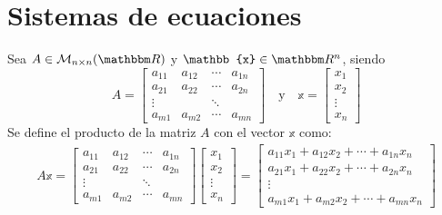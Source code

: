 \section{Sistemas de ecuaciones}

\begin{definition}\label{definicion:JSJJNDJUDUDJNDN}
    Sea $A \in \mathcal{M}_{n \times n}(\RR)$ y $\mathbb{x} \in \RR[n]$, siendo
    $$A = \begin{bmatrix}
        a_{11} & a_{12} & \cdots & a_{1n}\\
        a_{21} & a_{22} & \cdots & a_{2n}\\
        \vdots &  & \ddots & \\
        a_{m1} & a_{m2} & \cdots & a_{mn}
    \end{bmatrix} \quad \text{y} \quad \mathbb{x} = \begin{bmatrix}
        x_1 \\
        x_2 \\
        \vdots \\
        x_n
    \end{bmatrix}$$
    Se define el producto de la matriz $A$ con el vector $\mathbb{x}$ como:
    \begin{align*}
        A \mathbb{x} = \begin{bmatrix}
            a_{11} & a_{12} & \cdots & a_{1n}\\
            a_{21} & a_{22} & \cdots & a_{2n}\\
            \vdots &  & \ddots & \\
            a_{m1} & a_{m2} & \cdots & a_{mn}
        \end{bmatrix} \begin{bmatrix}
            x_1 \\
            x_2 \\
            \vdots \\
            x_n
        \end{bmatrix} = \begin{bmatrix}
            a_{11}x_1 + a_{12}x_2 + \cdots + a_{1n}x_n \\
            a_{21}x_1 + a_{22}x_2 + \cdots + a_{2n}x_n \\
            \vdots \\
            a_{m1}x_1 + a_{m2}x_2 + \cdots + a_{mn}x_n
        \end{bmatrix}
    \end{align*}
\end{definition}

